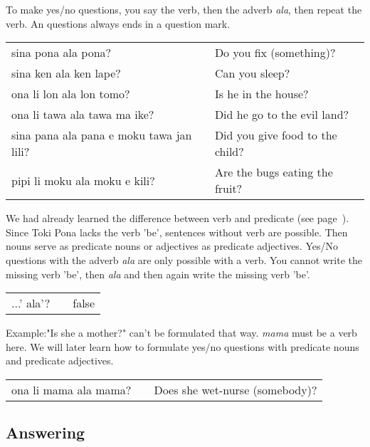 To make yes/no questions, you say the verb, then the adverb \textit{ala}, then repeat the verb. 
An questions always ends in a question mark.

\begin{supertabular}{p{5,5cm}|ll}
sina pona ala pona? && Do you fix (something)? \\
sina ken ala ken lape? && Can you sleep? \\
ona li lon ala lon tomo? && Is he in the house? \\
ona li tawa ala tawa ma ike? && Did he go to the evil land? \\
sina pana ala pana e moku tawa jan lili? && Did you give food to the child? \\
pipi li moku ala moku e kili? && Are the bugs eating the fruit? \\
\end{supertabular} 

We had already learned the difference between verb and predicate (see page~\pageref{'predicate'}). 
Since Toki Pona lacks the verb 'be', sentences without verb are possible. 
Then nouns serve as predicate nouns or adjectives as predicate adjectives. 
Yes/No questions with the adverb \textit{ala} are only possible with a verb. 
You cannot write the missing verb 'be', then \textit{ala} and then again write the missing verb 'be'.

\begin{supertabular}{p{5,5cm}|ll}
...' ala'? && false \\ %
\end{supertabular} 

Example:"Is she a mother?" can't be formulated that way. 
\textit{mama} must be a verb here. 
We will later learn how to formulate yes/no questions with predicate nouns and predicate adjectives.

\begin{supertabular}{p{5,5cm}|ll}
ona li mama ala mama? && Does she wet-nurse (somebody)?  \\
\end{supertabular} 
%
\subsection*{Answering}

